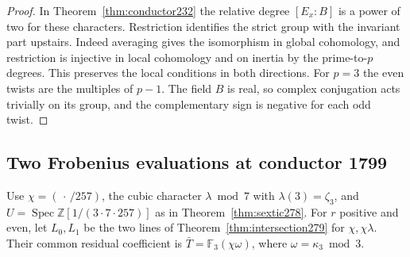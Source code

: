 \documentclass[a4paper,11pt]{article}
\theoremstyle{definition}
\theoremstyle{remark}
\newcommand{\ZZ}{\mathbb Z}\newcommand{\ord}{\operatorname{ord}}
\numberwithin{equation}{section}
\begin{document}
\begin{proof}
In Theorem~\ref{thm:conductor232} the relative degree
\([E_x:B]\) is a power of two for these characters.
Restriction identifies the strict group with the invariant
part upstairs. Indeed averaging gives the isomorphism in
global cohomology, and restriction is injective in local
cohomology and on inertia by the prime-to-\(p\) degrees.
This preserves the local conditions in both directions.
For \(p=3\) the even twists are the multiples of \(p-1\).
The field \(B\) is real, so complex conjugation acts trivially
on its group, and the complementary sign is negative for
each odd twist.
\end{proof}

\subsection{Two Frobenius evaluations at conductor 1799}\label{nav:III-52}
Use \(\chi=(\,\cdot\,/257)\), the cubic character
\(\lambda\bmod7\) with \(\lambda(3)=\zeta_3\), and
\(U=\operatorname{Spec}\ZZ[1/(3\cdot7\cdot257)]\) as in
Theorem~\ref{thm:sextic278}. For \(r\) positive and even, let
\(L_0,L_1\) be the two lines of
Theorem~\ref{thm:intersection279} for \(\chi,\chi\lambda\).
Their common residual coefficient is
\(\bar T=\mathbb F_3(\chi\omega)\), where
\(\omega=\kappa_3\bmod3\).
\end{document}
